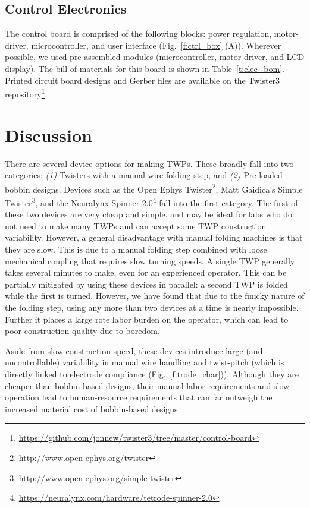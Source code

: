 \documentclass[11pt,a4paper]{article}
\begin{document}
\subsection{Control Electronics}
The control board is comprised of the following blocks: power regulation,
motor-driver, microcontroller, and user interface (Fig.~\ref{f:ctrl_box} (A)).
Wherever possible, we used pre-assembled modules (microcontroller, motor
driver, and LCD display). The bill of materials for this board is shown in
Table~\ref{t:elec_bom}. Printed circuit board designs and Gerber files are
available on the Twister3
repository\footnote{\url{https://github.com/jonnew/twister3/tree/master/control-board}}.

\section{Discussion}
There are several device options for making TWPs. These broadly fall into two
categories: \textit{(1)} Twisters with a manual wire folding step, and
\textit{(2)} Pre-loaded bobbin designs. Devices such as the Open Ephys
Twister\footnote{\url{http://www.open-ephys.org/twister}}, Matt Gaidica's
Simple Twister\footnote{\url{http://www.open-ephys.org/simple-twister}}, and
the Neuralynx
Spinner-2.0\footnote{\url{https://neuralynx.com/hardware/tetrode-spinner-2.0}}
fall into the first category. The first of these two devices are very cheap and
simple, and may be ideal for labs who do not need to make many TWPs and can
accept some TWP construction variability. However, a general disadvantage with manual
folding machines is that they are slow. This is due to a  manual folding step
combined with loose mechanical coupling that requires slow turning speeds.  A
single TWP generally takes several minutes to make, even for an experienced
operator. This can be partially mitigated by using these devices in
parallel: a second TWP is folded while the first is turned. However, we have
found that due to the finicky nature of the folding step, using any more than
two devices at a time is nearly impossible. Further it places a large rote
labor burden on the operator, which can lead to poor construction quality due
to boredom.

Aside from slow construction speed, these devices introduce large (and
uncontrollable) variability in manual wire handling and twist-pitch (which is
directly linked to electrode compliance (Fig.~\ref{f:trode_char})). Although
they are cheaper than bobbin-based designs, their manual labor requirements and
slow operation lead to human-resource requirements that can far outweigh the
increased material cost of bobbin-based designs.
\end{document}
